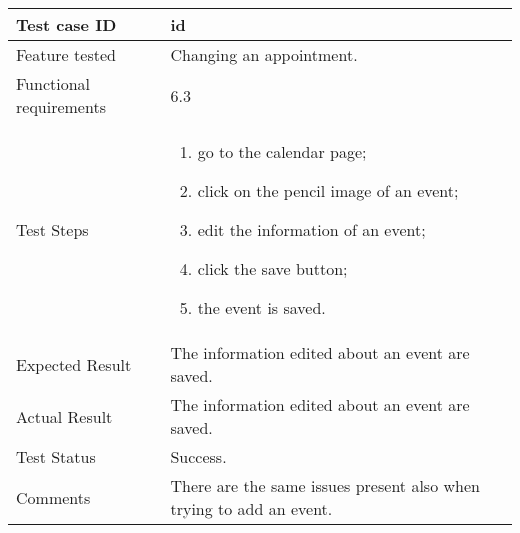 \begin{table}[H]
	\begin{center}
		\begin{tabular}{ | p{} | p{} | }
		\hline
		Test case ID & id\\
		\hline
		Feature tested & Changing an appointment.\\
    	\hline
		Functional requirements & 6.3  \\
		\hline
		Test Steps & 
			\begin{enumerate}
				\item go to the calendar page;
				\item click on the pencil image of an event;
				\item edit the information of an event;
				\item click the save button;
				\item the event is saved.
			\end{enumerate} \\
		\hline
		Expected Result & The information edited about an event are saved.\\
		\hline
		Actual Result & The information edited about an event are saved.\\ 
		\hline
		Test Status & \color{ForestGreen}Success.\\ 
		\hline
		Comments & There are the same issues present also when trying to add an event.
		\end{tabular}
	\end{center}
\end{table}

